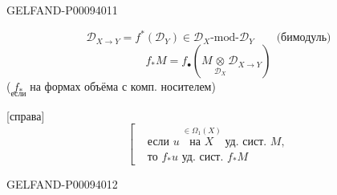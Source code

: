 \begin{GelfandAdjacentEvidence}{GELFAND-P000940}{11}


\begin{equation*}
 \mathcal D_{X\to Y}=f^*(\mathcal D_Y)\in\mathcal D_X\text{-mod-}\mathcal D_Y
 \qquad\text{(бимодуль)}
 \tag{2}
\end{equation*}
\begin{equation*}
 f_*M=f_\bullet\left(M\mathbin{\underset{\mathcal D_X}{\otimes}}\mathcal D_{X\to Y}\right)
 \tag{3}
\end{equation*}
(\(\underset{\text{если}}{f_*}\) на формах объёма с комп. носителем)

[справа]
\[
 \left[\begin{aligned}
 &\text{если }u\ \overset{\in\Omega_1(X)}{\text{на $X$}}\text{ уд. сист. }M,\\
 &\text{то }f_*u\text{ уд. сист. }f_*M
 \end{aligned}\right.
\]
\end{GelfandAdjacentEvidence}
\begin{GelfandAdjacentEvidence}{GELFAND-P000940}{12}

\end{GelfandAdjacentEvidence}


